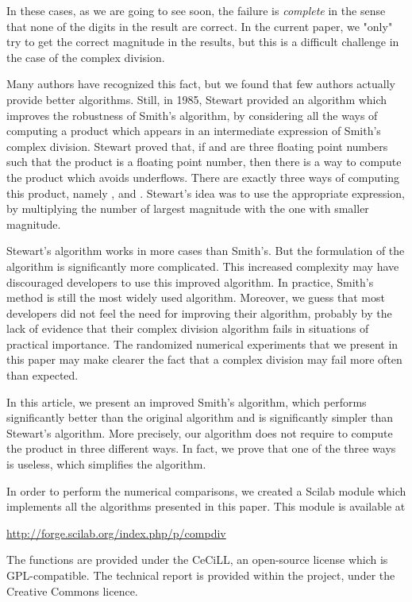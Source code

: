 \documentclass{paper}
\begin{document}
In these cases, as we are going to see soon, the failure 
is \emph{complete} in the sense that 
none of the digits in the result are correct. 
In the current paper, we "only" try to get the correct 
magnitude in the results, but this 
is a difficult challenge in the case of the complex division. 

Many authors have recognized this fact, but we found that few authors 
actually provide better algorithms. 
Still, in 1985, Stewart \cite{214414,Stewart:1986:CNC} provided an 
algorithm which improves the robustness of Smith's algorithm, 
by considering all the ways of computing a product 
 which appears in an intermediate 
expression of Smith's complex division. 
Stewart proved that, if  and  are three floating point 
numbers such that the product  is a 
floating point number, then there is a way to compute the product which 
avoids underflows.
There are exactly three ways of computing this product, namely 
,  and 
. 
Stewart's idea was to use the appropriate expression, by 
multiplying the number of largest magnitude with the one with 
smaller magnitude. 

Stewart's algorithm works in more cases than Smith's. 
But the formulation of the algorithm is significantly more complicated. 
This increased complexity may have discouraged developers 
to use this improved algorithm. 
In practice, Smith's method is still the most widely used 
algorithm. 
Moreover, we guess that most developers did not feel the 
need for improving their algorithm, probably by the 
lack of evidence that their complex division algorithm fails 
in situations of practical importance. 
The randomized numerical experiments that we present in this paper 
may make clearer the fact that a complex division may fail more often 
than expected. 

In this article, we present an improved Smith's algorithm, 
which performs significantly better than the original 
algorithm and is significantly simpler than Stewart's algorithm. 
More precisely, our algorithm does not require to compute 
the product  in three different 
ways. 
In fact, we prove that one of the three ways is useless, 
which simplifies the algorithm. 

In order to perform the numerical comparisons, we created 
a Scilab module which implements all the algorithms presented 
in this paper. 
This module is available at 
\begin{center}
\url{http://forge.scilab.org/index.php/p/compdiv}
\end{center}
The functions are provided under the CeCiLL, an open-source 
license which is GPL-compatible. 
The technical report \cite{BaudinSmithImpCD2011} is provided within the project, 
under the Creative Commons licence.
\end{document}
